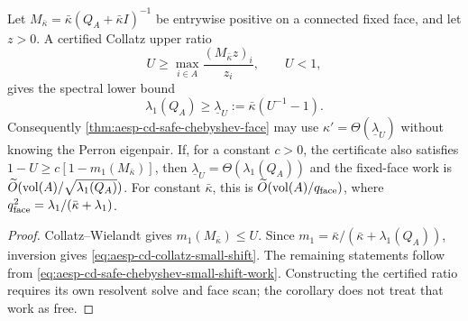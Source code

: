 \begin{corollary}
\label{cor:aesp-cd-collatz-small-shift}
Let
$M_{\bar\kappa}=\bar\kappa(Q_A+\bar\kappa I)^{-1}$ be entrywise positive
on a connected fixed face, and let $z>0$.  A certified Collatz upper ratio
\begin{equation*}
 U\geq\max_{i\in A}\frac{(M_{\bar\kappa}z)_i}{z_i},
 \qquad U<1,
\end{equation*}
gives the spectral lower bound
\begin{equation}
 \lambda_1(Q_A)\geq
 \underline\lambda_U:=\bar\kappa(U^{-1}-1).
 \label{eq:aesp-cd-collatz-small-shift}
\end{equation}
Consequently \cref{thm:aesp-cd-safe-chebyshev-face} may use
$\kappa'=\Theta(\underline\lambda_U)$ without knowing the Perron eigenpair.
If, for a constant $c>0$, the certificate also satisfies
$1-U\geq c[1-m_1(M_{\bar\kappa})]$, then
$\underline\lambda_U=\Theta(\lambda_1(Q_A))$ and the fixed-face work is
$\widetilde O(\operatorname{vol}(A)/\sqrt{\lambda_1(Q_A)})$.
For constant $\bar\kappa$, this is
$\widetilde O(\operatorname{vol}(A)/q_{\rm face})$, where
$q_{\rm face}^2=\lambda_1/(\bar\kappa+\lambda_1)$.
\end{corollary}

\begin{proof}
Collatz--Wielandt gives
$m_1(M_{\bar\kappa})\leq U$.  Since
$m_1=\bar\kappa/(\bar\kappa+\lambda_1(Q_A))$, inversion gives
\cref{eq:aesp-cd-collatz-small-shift}.  The remaining statements follow from
\cref{eq:aesp-cd-safe-chebyshev-small-shift-work}.
Constructing the certified ratio requires its own resolvent solve and face
scan; the corollary does not treat that work as free.
\end{proof}

